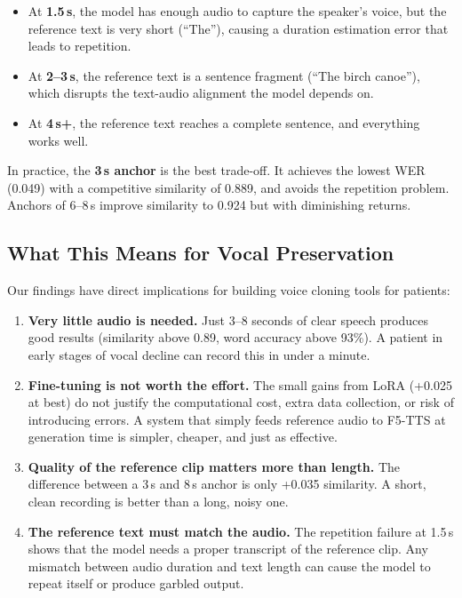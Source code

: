 \documentclass[11pt, a4paper]{article}
\begin{document}
\begin{itemize}[itemsep=4pt]
    \item At \textbf{1.5\,s}, the model has enough audio to capture the speaker's voice, but the reference text is very short (``The''), causing a duration estimation error that leads to repetition.
    \item At \textbf{2--3\,s}, the reference text is a sentence fragment (``The birch canoe''), which disrupts the text-audio alignment the model depends on.
    \item At \textbf{4\,s+}, the reference text reaches a complete sentence, and everything works well.
\end{itemize}

In practice, the \textbf{3\,s anchor} is the best trade-off. It achieves the lowest WER (0.049) with a competitive similarity of 0.889, and avoids the repetition problem. Anchors of 6--8\,s improve similarity to 0.924 but with diminishing returns.

\subsection{What This Means for Vocal Preservation}

Our findings have direct implications for building voice cloning tools for patients:

\begin{enumerate}[itemsep=4pt]
    \item \textbf{Very little audio is needed.} Just 3--8 seconds of clear speech produces good results (similarity above 0.89, word accuracy above 93\%). A patient in early stages of vocal decline can record this in under a minute.

    \item \textbf{Fine-tuning is not worth the effort.} The small gains from LoRA (+0.025 at best) do not justify the computational cost, extra data collection, or risk of introducing errors. A system that simply feeds reference audio to F5-TTS at generation time is simpler, cheaper, and just as effective.

    \item \textbf{Quality of the reference clip matters more than length.} The difference between a 3\,s and 8\,s anchor is only +0.035 similarity. A short, clean recording is better than a long, noisy one.

    \item \textbf{The reference text must match the audio.} The repetition failure at 1.5\,s shows that the model needs a proper transcript of the reference clip. Any mismatch between audio duration and text length can cause the model to repeat itself or produce garbled output.
\end{enumerate}
\end{document}
